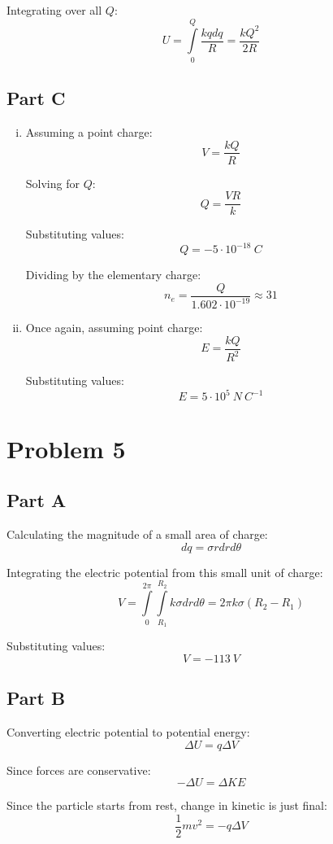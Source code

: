 \documentclass{article}
\begin{document}
Integrating over all $Q$:
$$ U = \int\limits_{0}^{Q} \frac{ k q dq }{ R } = \frac{ k Q^{2} }{ 2R }$$

\subsection*{Part C}

\begin{enumerate}[i.]
  \item Assuming a point charge:
    $$ V = \frac{ k Q }{ R } $$

    Solving for $Q$:
    $$ Q = \frac{ V R }{ k } $$

    Substituting values:
    $$ Q = -5 \cdot 10^{-18}\ \si{C} $$

    Dividing by the elementary charge:
    $$ n_{e} = \frac{ Q }{ 1.602 \cdot 10^{-19} }\approx 31 $$
  \item Once again, assuming point charge:
    $$ E = \frac{ k Q }{ R^{2} } $$

    Substituting values:
    $$ E = 5 \cdot 10^{5}\ \si{N\ C^{-1}} $$
\end{enumerate}

\section*{Problem 5}

\subsection*{Part A}

Calculating the magnitude of a small area of charge:
$$ dq = \sigma r dr d\theta $$

Integrating the electric potential from this small unit of charge:
$$ V = \int\limits_{0}^{2 \pi}\int\limits_{R_{1}}^{R_{2}} k \sigma dr
d\theta = 2 \pi k \sigma (R_{2} - R_{1})$$

Substituting values:
$$ V = -113\ \si{V} $$

\subsection*{Part B}

Converting electric potential to potential energy:
$$ \Delta U = q\Delta V  $$

Since forces are conservative:
$$ -\Delta U = \Delta KE $$

Since the particle starts from rest, change in kinetic is just final:
$$ \frac{ 1 }{ 2 } m v^{2} = -q \Delta V $$
\end{document}
